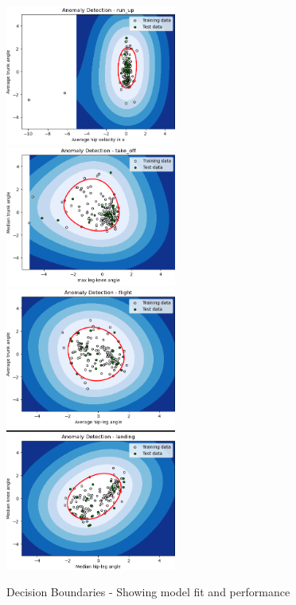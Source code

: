 \documentclass[12pt, letterpaper]{article}
\begin{document}
\begin{figure}[htbp]
    \includegraphics[width=0.5\textwidth]{plots/model_run_up.png}
    \includegraphics[width=0.5\textwidth]{plots/model_take_off.png}
    \includegraphics[width=0.5\textwidth]{plots/model_flight.png}
    \includegraphics[width=0.5\textwidth]{plots/model_landing.png}
    \caption{Decision Boundaries - Showing model fit and performance}
\end{figure}
\end{document}
